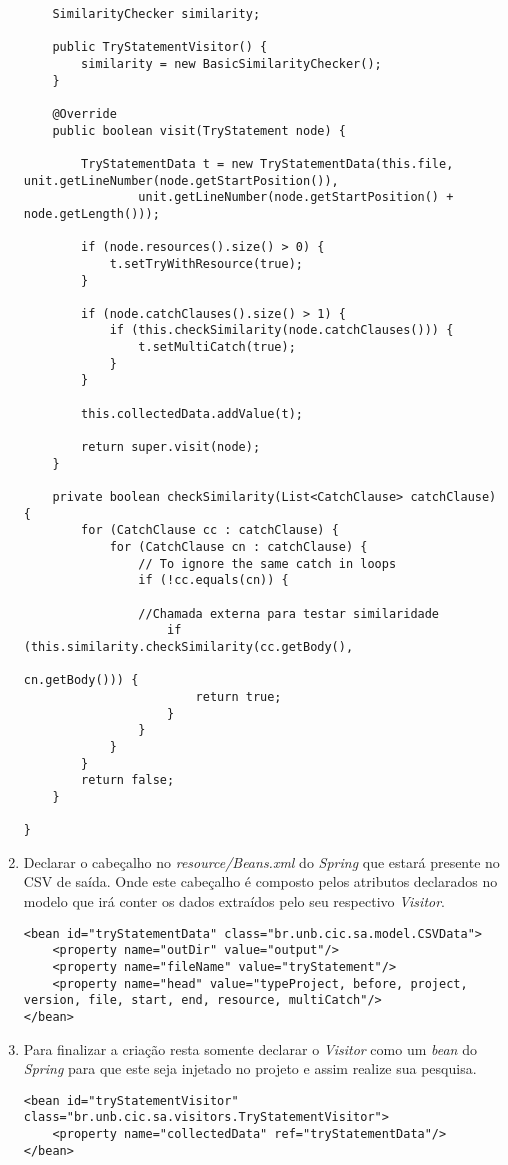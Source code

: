 \begin{enumerate}
\begin{lstlisting}
	SimilarityChecker similarity;

	public TryStatementVisitor() {
		similarity = new BasicSimilarityChecker();
	}

	@Override
	public boolean visit(TryStatement node) {

		TryStatementData t = new TryStatementData(this.file, unit.getLineNumber(node.getStartPosition()),
				unit.getLineNumber(node.getStartPosition() + node.getLength()));
		
		if (node.resources().size() > 0) {
			t.setTryWithResource(true);
		}
	
		if (node.catchClauses().size() > 1) {
			if (this.checkSimilarity(node.catchClauses())) {
				t.setMultiCatch(true);
			}
		}

		this.collectedData.addValue(t);

		return super.visit(node);
	}
	
	private boolean checkSimilarity(List<CatchClause> catchClause) {
		for (CatchClause cc : catchClause) {
			for (CatchClause cn : catchClause) {
				// To ignore the same catch in loops
				if (!cc.equals(cn)) {
				
				//Chamada externa para testar similaridade
					if (this.similarity.checkSimilarity(cc.getBody(),
														cn.getBody())) {
						return true;
					}
				}
			}
		}
		return false;
	}

}
			\end{lstlisting}
			
	
			\item Declarar o cabeçalho no \textit{resource/Beans.xml} do \textit{Spring} que estará presente no \acs{CSV} de saída. Onde este cabeçalho é composto pelos atributos declarados no modelo que irá conter os dados extraídos pelo seu respectivo \textit{Visitor}.
			
			\begin{lstlisting}
<bean id="tryStatementData" class="br.unb.cic.sa.model.CSVData">
	<property name="outDir" value="output"/>
	<property name="fileName" value="tryStatement"/>
	<property name="head" value="typeProject, before, project, version, file, start, end, resource, multiCatch"/> 
</bean>
			\end{lstlisting}
			
			
			\item Para finalizar a criação resta somente declarar o \textit{Visitor} como um \textit{bean} do \textit{Spring} para que este seja injetado no projeto e assim realize sua pesquisa.
			
			\begin{lstlisting}
<bean id="tryStatementVisitor" class="br.unb.cic.sa.visitors.TryStatementVisitor">
	<property name="collectedData" ref="tryStatementData"/>
</bean>
			\end{lstlisting}
			
	\end{enumerate}




